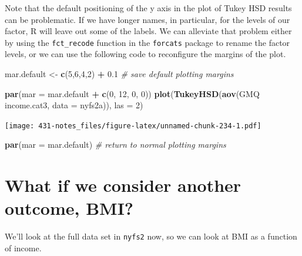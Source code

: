 \documentclass[
]{book}
\newenvironment{Shaded}{\begin{snugshade}}{\end{snugshade}}
\newcommand{\CommentTok}[1]{\textcolor[rgb]{0.56,0.35,0.01}{\textit{#1}}}
\newcommand{\DataTypeTok}[1]{\textcolor[rgb]{0.13,0.29,0.53}{#1}}
\newcommand{\DecValTok}[1]{\textcolor[rgb]{0.00,0.00,0.81}{#1}}
\newcommand{\FloatTok}[1]{\textcolor[rgb]{0.00,0.00,0.81}{#1}}
\newcommand{\KeywordTok}[1]{\textcolor[rgb]{0.13,0.29,0.53}{\textbf{#1}}}
\newcommand{\NormalTok}[1]{#1}
\newcommand{\OperatorTok}[1]{\textcolor[rgb]{0.81,0.36,0.00}{\textbf{#1}}}
\newcommand{\StringTok}[1]{\textcolor[rgb]{0.31,0.60,0.02}{#1}}
\begin{document}
Note that the default positioning of the y axis in the plot of Tukey HSD results can be problematic. If we have longer names, in particular, for the levels of our factor, R will leave out some of the labels. We can alleviate that problem either by using the \texttt{fct\_recode} function in the \texttt{forcats} package to rename the factor levels, or we can use the following code to reconfigure the margins of the plot.

\begin{Shaded}
\begin{Highlighting}[]
\NormalTok{mar.default <-}\StringTok{ }\KeywordTok{c}\NormalTok{(}\DecValTok{5}\NormalTok{,}\DecValTok{6}\NormalTok{,}\DecValTok{4}\NormalTok{,}\DecValTok{2}\NormalTok{) }\OperatorTok{+}\StringTok{ }\FloatTok{0.1} \CommentTok{# save default plotting margins}

\KeywordTok{par}\NormalTok{(}\DataTypeTok{mar =}\NormalTok{ mar.default }\OperatorTok{+}\StringTok{ }\KeywordTok{c}\NormalTok{(}\DecValTok{0}\NormalTok{, }\DecValTok{12}\NormalTok{, }\DecValTok{0}\NormalTok{, }\DecValTok{0}\NormalTok{)) }
\KeywordTok{plot}\NormalTok{(}\KeywordTok{TukeyHSD}\NormalTok{(}\KeywordTok{aov}\NormalTok{(GMQ }\OperatorTok{~}\StringTok{ }\NormalTok{income.cat3, }\DataTypeTok{data =}\NormalTok{ nyfs2a)), }\DataTypeTok{las =} \DecValTok{2}\NormalTok{)}
\end{Highlighting}
\end{Shaded}

\texttt{[image: 431-notes\_files/figure-latex/unnamed-chunk-234-1.pdf]}

\begin{Shaded}
\begin{Highlighting}[]
\KeywordTok{par}\NormalTok{(}\DataTypeTok{mar =}\NormalTok{ mar.default) }\CommentTok{# return to normal plotting margins}
\end{Highlighting}
\end{Shaded}

\hypertarget{what-if-we-consider-another-outcome-bmi}{%
\section{What if we consider another outcome, BMI?}\label{what-if-we-consider-another-outcome-bmi}}

We'll look at the full data set in \texttt{nyfs2} now, so we can look at BMI as a function of income.
\end{document}
